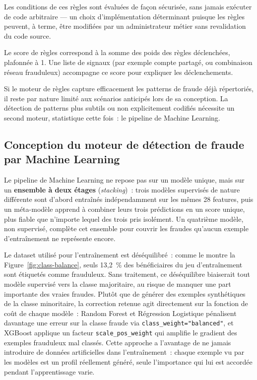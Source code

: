 \documentclass[a4paper, oneside, 12pt]{book}
\begin{document}
\hspace{0.5cm}Les conditions de ces règles sont évaluées de façon sécurisée, sans jamais exécuter de code arbitraire — un choix d'implémentation déterminant puisque les règles peuvent, à terme, être modifiées par un administrateur métier sans revalidation du code source.

\hspace{0.5cm}Le score de règles correspond à la somme des poids des règles déclenchées, plafonnée à 1. Une liste de signaux (par exemple compte partagé, ou combinaison réseau frauduleux) accompagne ce score pour expliquer les déclenchements.

\hspace{0.5cm}Si le moteur de règles capture efficacement les patterns de fraude déjà répertoriés, il reste par nature limité aux scénarios anticipés lors de sa conception. La détection de patterns plus subtils ou non explicitement codifiés nécessite un second moteur, statistique cette fois~: le pipeline de Machine Learning.

\subsection{Conception du moteur de détection de fraude par Machine Learning}

\hspace{0.5cm}Le pipeline de Machine Learning ne repose pas sur un modèle unique, mais sur un \textbf{ensemble à deux étages} (\textit{stacking})~: trois modèles supervisés de nature différente sont d'abord entraînés indépendamment sur les mêmes 28 features, puis un méta-modèle apprend à combiner leurs trois prédictions en un score unique, plus fiable que n'importe lequel des trois pris isolément. Un quatrième modèle, non supervisé, complète cet ensemble pour couvrir les fraudes qu'aucun exemple d'entraînement ne représente encore.

\hspace{0.5cm}Le dataset utilisé pour l'entraînement est déséquilibré~: comme le montre la Figure~\ref{fig:class-balance}, seuls 13,2~\% des bénéficiaires du jeu d'entraînement sont étiquetés comme frauduleux. Sans traitement, ce déséquilibre biaiserait tout modèle supervisé vers la classe majoritaire, au risque de manquer une part importante des vraies fraudes. Plutôt que de générer des exemples synthétiques de la classe minoritaire, la correction retenue agit directement sur la fonction de coût de chaque modèle~: Random Forest et Régression Logistique pénalisent davantage une erreur sur la classe fraude via \texttt{class\_weight="balanced"}, et XGBoost applique un facteur \texttt{scale\_pos\_weight} qui amplifie le gradient des exemples frauduleux mal classés. Cette approche a l'avantage de ne jamais introduire de données artificielles dans l'entraînement~: chaque exemple vu par les modèles est un profil réellement généré, seule l'importance qui lui est accordée pendant l'apprentissage varie.
\end{document}
